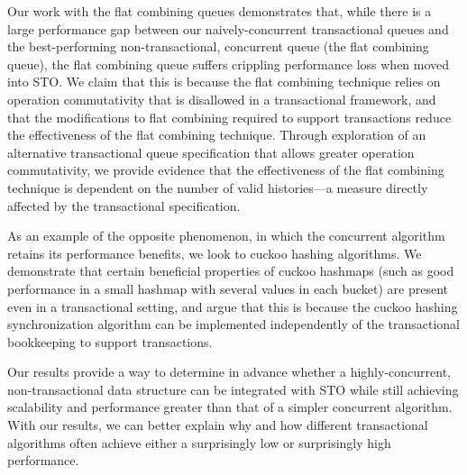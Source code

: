 Our work with the flat combining queues demonstrates that, while there is a large performance gap between our naively-concurrent transactional queues and the best-performing non-transactional, concurrent queue (the flat combining queue), the flat combining queue suffers crippling performance loss when moved into STO. We claim that this is because the flat combining technique relies on operation commutativity that is disallowed in a transactional framework, and that the modifications to flat combining required to support transactions reduce the effectiveness of the flat combining technique. Through exploration of an alternative transactional queue specification that allows greater operation commutativity, we provide evidence that the effectiveness of the flat combining technique is dependent on the number of valid histories---a measure directly affected by the transactional specification.

As an example of the opposite phenomenon, in which the concurrent algorithm retains its performance benefits, we look to cuckoo hashing algorithms. We demonstrate that certain beneficial properties of cuckoo hashmaps (such as good performance in a small hashmap with several values in each bucket) are present even in a transactional setting, and argue that this is because the cuckoo hashing synchronization algorithm can be implemented independently of the transactional bookkeeping to support transactions.

Our results provide a way to determine in advance whether a highly-concurrent, non-transactional data structure can be integrated with STO while still achieving scalability and performance greater than that of a simpler concurrent algorithm. With our results, we can better explain why and how different transactional algorithms often achieve either a surprisingly low or surprisingly high performance.
